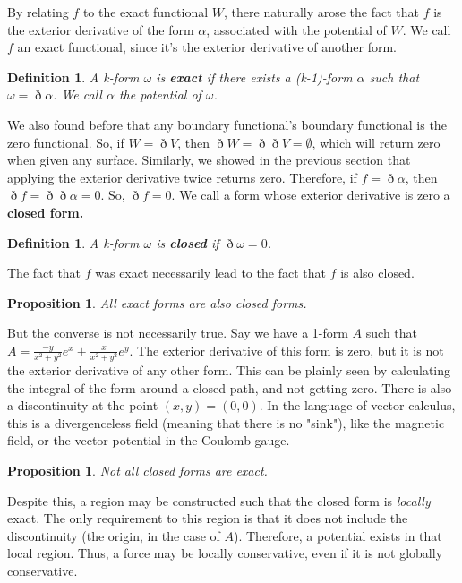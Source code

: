\documentclass{book}
\newtheorem{defn}[equation]{Definition}
\newtheorem{prop}[equation]{Proposition}
\begin{document}
By relating $f$ to the exact functional $W$, there naturally arose the fact that $f$ is the exterior derivative of the form $\alpha$, associated with the potential of $W$. We call $f$ an exact functional, since it's the exterior derivative of another form. 

\begin{defn} 
	A k-form \textbf{$\omega$} is \textbf{exact} if there exists a (k-1)-form $\alpha$ such that $\omega = \eth\alpha$. We call $\alpha$ the potential of $\omega$. 
\end{defn}

We also found before that any boundary functional's boundary functional is the zero functional. So, if $W = \eth V$, then $\eth W = \eth\eth V = \emptyset$, which will return zero when given any surface. Similarly, we showed in the previous section that applying the exterior derivative twice returns zero. Therefore, if $f = \eth \alpha$, then $\eth f = \eth \eth \alpha = 0$. So, $\eth f = 0$. We call a form whose exterior derivative is zero a \textbf{closed form.}

\begin{defn} 
	A k-form \textbf{$\omega$} is \textbf{closed} if $\eth\omega = 0$. 
\end{defn}

The fact that $f$ was exact necessarily lead to the fact that $f$ is also closed. 

\begin{prop}
	All exact forms are also closed forms.
\end{prop}

But the converse is not necessarily true. Say we have a 1-form $A$ such that $A = \frac{-y}{x^2 + y^2} e^x + \frac{x}{x^2 + y^2} e^y$. The exterior derivative of this form is zero, but it is not the exterior derivative of any other form. This can be plainly seen by calculating the integral of the form around a closed path, and not getting zero. There is also a discontinuity at the point $(x,y) = (0,0)$. In the language of vector calculus, this is a divergenceless field (meaning that there is no "sink"), like the magnetic field, or the vector potential in the Coulomb gauge.  


\begin{prop}
	Not all closed forms are exact. 	
\end{prop}


 Despite this, a region may be constructed such that the closed form is \emph{locally} exact. The only requirement to this region is that it does not include the discontinuity (the origin, in the case of $A$). Therefore, a potential exists in that local region. Thus, a force may be locally conservative, even if it is not globally conservative. 
\end{document}
